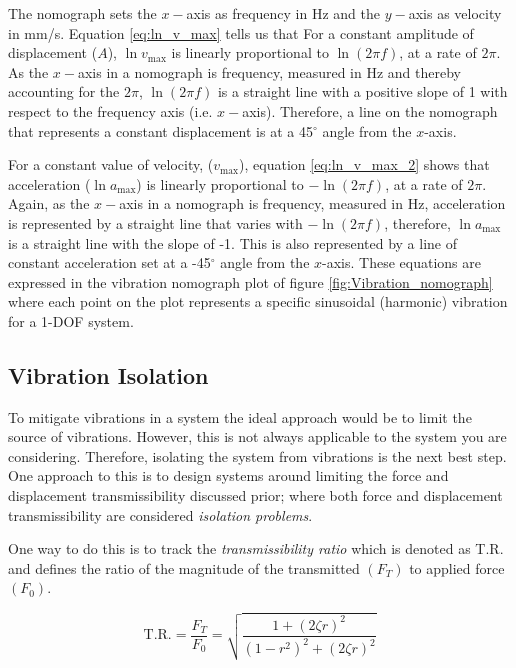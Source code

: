 \documentclass[12pt,letter]{article}
\begin{document}
The nomograph sets the $x-$axis as frequency in Hz and the $y-$axis as velocity in mm/s. Equation \ref{eq:ln_v_max} tells us that For a constant amplitude of displacement ($A$), $\ln v_\text{max}$ is linearly proportional to $\ln (2 \pi f)$, at a rate of $2 \pi$. As the $x-$axis in a nomograph is frequency, measured in Hz and thereby accounting for the $2 \pi$, $\ln (2 \pi f)$ is a straight line with a positive slope of 1 with respect to the frequency axis (i.e. $x-$axis). Therefore, a line on the nomograph that represents a constant displacement is at a 45$^\circ$ angle from the $x$-axis. 


For a constant value of velocity, ($v_\text{max}$), equation \ref{eq:ln_v_max_2} shows that acceleration ($\ln a_\text{max}$) is linearly proportional to $-\ln (2 \pi f)$, at a rate of $2 \pi$. Again, as the $x-$axis in a nomograph is frequency, measured in Hz, acceleration is represented by a straight line that varies with $- \ln(2\pi f)$, therefore, $\ln a_\text{max}$ is a straight line with the slope of -1. This is also represented by a line of constant acceleration set at a -45$^\circ$ angle from the $x$-axis. These equations are expressed in the vibration nomograph plot of figure \ref{fig:Vibration_nomograph} where each point on the plot represents a specific sinusoidal (harmonic) vibration for a 1-DOF system.  


\subsection{Vibration Isolation}



To mitigate vibrations in a system the ideal approach would be to limit the source of vibrations. However, this is not always applicable to the system you are considering. Therefore, isolating the system from vibrations is the next best step. One approach to this is to design systems around limiting the force and displacement transmissibility discussed prior; where both force and displacement transmissibility are considered \emph{isolation problems}.

One way to do this is to track the \emph{transmissibility ratio} which is denoted as T.R. and defines the ratio of the magnitude of the transmitted $(F_T)$ to applied force $(F_0)$. 

\begin{equation}
	\text{T.R.} = \frac{F_T}{F_0} = \sqrt{\frac{1+(2 \zeta r )^2}{(1-r^2)^2+(2 \zeta r )^2}}
\end{equation}
\end{document}
